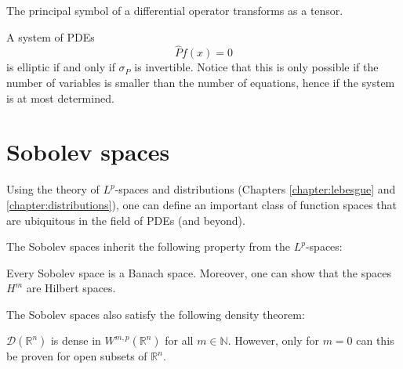     \begin{property}
        The principal symbol of a differential operator transforms as a tensor.
    \end{property}
    \begin{definition}[Ellipticity]
        A system of PDEs \[\hat{P}f(x) = 0\] is elliptic if and only if $\sigma_P$ is invertible. Notice that this is only possible if the number of variables is smaller than the number of equations, hence if the system is at most determined.
    \end{definition}

\section{Sobolev spaces}

    Using the theory of $L^p$-spaces and distributions (Chapters \ref{chapter:lebesgue} and \ref{chapter:distributions}), one can define an important class of function spaces that are ubiquitous in the field of PDEs (and beyond).


    The Sobolev spaces inherit the following property from the $L^p$-spaces:
    \begin{property}[Completeness]
        Every Sobolev space is a Banach space. Moreover, one can show that the spaces $H^m$ are Hilbert spaces.
    \end{property}
    The Sobolev spaces also satisfy the following density theorem:
    \begin{property}
        $\mathcal{D}(\mathbb{R}^n)$ is dense in $W^{m,p}(\mathbb{R}^n)$ for all $m\in\mathbb{N}$. However, only for $m=0$ can this be proven for open subsets of $\mathbb{R}^n$.
    \end{property}

